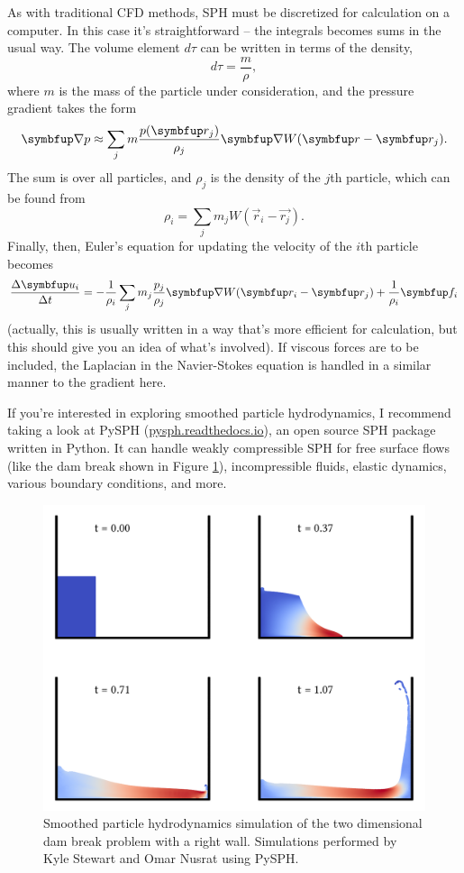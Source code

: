 As with traditional CFD methods, SPH must be discretized for calculation on a computer.  In this case it's straightforward -- the integrals becomes sums in the usual way.  The volume element $d\tau$ can be written in terms of the density,
\[
d\tau = \frac{ m}{ \rho},
\]
where $m$ is the mass of the particle under consideration, and the pressure gradient takes the form
\[
\grad p \approx \sum_j m \frac{p(\vec{r}_j)}{\rho_j} \grad W(\vec{r} - \vec{r}_j).
\]
The sum is over all particles, and $\rho_j$ is the density of the $j$th particle, which can be found from
\[
\rho_i = \sum_j m_j W(\vec{r}_i - \vec{r_j}).
\]
Finally, then, Euler's equation for updating the velocity of the $i$th particle becomes
\begin{equation}
\frac{\Delta \vec{u}_i}{\Delta t} = -\frac{1}{\rho_i} \sum_j m_j \frac{p_j}{\rho_j} \grad W(\vec{r}_i - \vec{r}_j) + \frac{1}{\rho_i} \vec{f}_i
\end{equation}
(actually, this is usually written in a way that's more efficient for calculation, but this should give you an idea of what's involved).  If viscous forces are to be included, the Laplacian in the Navier-Stokes equation is handled in a similar manner to the gradient here.

If you're interested in exploring smoothed particle hydrodynamics, I recommend taking a look at PySPH (\url{pysph.readthedocs.io}), an open source SPH package written in Python.  It can handle weakly compressible SPH for free surface flows (like the dam break shown in Figure \ref{fig_sph_dam}), incompressible fluids, elastic dynamics, various boundary conditions, and more.  


\begin{figure}
\centering
\includegraphics[width=\linewidth]{Figures/Chapter6/fig_sph_dam}
\caption{Smoothed particle hydrodynamics simulation of the two dimensional dam break problem with a right wall.  Simulations performed by Kyle Stewart and Omar Nusrat using PySPH. }
\label{fig_sph_dam}
\end{figure}


